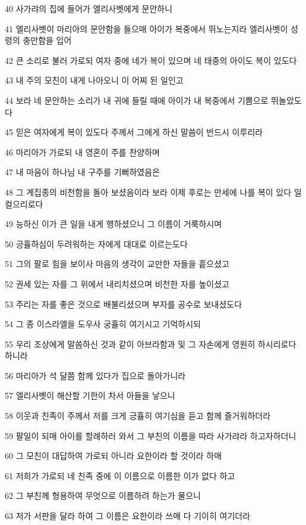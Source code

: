 \par 40 사가랴의 집에 들어가 엘리사벳에게 문안하니
\par 41 엘리사벳이 마리아의 문안함을 들으매 아이가 복중에서 뛰노는지라 엘리사벳이 성령의 충만함을 입어
\par 42 큰 소리로 불러 가로되 여자 중에 네가 복이 있으며 네 태중의 아이도 복이 있도다
\par 43 내 주의 모친이 내게 나아오니 이 어찌 된 일인고
\par 44 보라 네 문안하는 소리가 내 귀에 들릴 때에 아이가 내 복중에서 기쁨으로 뛰놀았도다
\par 45 믿은 여자에게 복이 있도다 주께서 그에게 하신 말씀이 반드시 이루리라
\par 46 마리아가 가로되 내 영혼이 주를 찬양하며
\par 47 내 마음이 하나님 내 구주를 기뻐하였음은
\par 48 그 계집종의 비천함을 돌아 보셨음이라 보라 이제 후로는 만세에 나를 복이 있다 일컬으리로다
\par 49 능하신 이가 큰 일을 내게 행하셨으니 그 이름이 거룩하시며
\par 50 긍휼하심이 두려워하는 자에게 대대로 이르는도다
\par 51 그의 팔로 힘을 보이사 마음의 생각이 교만한 자들을 흩으셨고
\par 52 권세 있는 자를 그 위에서 내리치셨으며 비천한 자를 높이셨고
\par 53 주리는 자를 좋은 것으로 배불리셨으며 부자를 공수로 보내셨도다
\par 54 그 종 이스라엘을 도우사 궁휼히 여기시고 기억하시되
\par 55 우리 조상에게 말씀하신 것과 같이 아브라함과 및 그 자손에게 영원히 하시리로다 하니라
\par 56 마리아가 석 달쯤 함께 있다가 집으로 돌아가니라
\par 57 엘리사벳이 해산할 기한이 차서 아들을 낳으니
\par 58 이웃과 친족이 주께서 저를 크게 긍휼히 여기심을 듣고 함께 즐거워하더라
\par 59 팔일이 되매 아이를 할례하러 와서 그 부친의 이름을 따라 사가랴라 하고자하더니
\par 60 그 모친이 대답하여 가로되 아니라 요한이라 할 것이라 하매
\par 61 저희가 가로되 네 친족 중에 이 이름으로 이름한 이가 없다 하고
\par 62 그 부친께 형용하여 무엇으로 이름하려 하는가 물으니
\par 63 저가 서판을 달라 하여 그 이름은 요한이라 쓰매 다 기이히 여기더라
